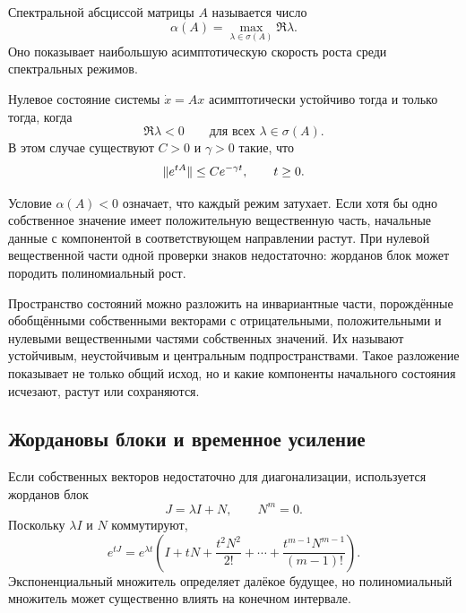 \begin{definition}
Спектральной абсциссой матрицы $A$ называется число
\begin{equation}
\label{eq:spectral-abscissa-v02}
\alpha(A)=\max_{\lambda\in\sigma(A)}\Re\lambda.
\end{equation}
Оно показывает наибольшую асимптотическую скорость роста среди спектральных режимов.
\end{definition}

\begin{theorem}
\label{thm:linear-spectral-stability-v02}
Нулевое состояние системы $\dot x=Ax$ асимптотически устойчиво тогда и только тогда, когда
\[
\Re\lambda<0
\qquad
\text{для всех }\lambda\in\sigma(A).
\]
В этом случае существуют $C>0$ и $\gamma>0$ такие, что
\begin{equation}
\label{eq:linear-exponential-decay-v02}
\lVert e^{tA}\rVert\leq Ce^{-\gamma t},
\qquad t\geq0.
\end{equation}
\end{theorem}

Условие $\alpha(A)<0$ означает, что каждый режим затухает. Если хотя бы одно собственное значение имеет положительную вещественную часть, начальные данные с компонентой в соответствующем направлении растут. При нулевой вещественной части одной проверки знаков недостаточно: жорданов блок может породить полиномиальный рост.

Пространство состояний можно разложить на инвариантные части, порождённые обобщёнными собственными векторами с отрицательными, положительными и нулевыми вещественными частями собственных значений. Их называют устойчивым, неустойчивым и центральным подпространствами. Такое разложение показывает не только общий исход, но и какие компоненты начального состояния исчезают, растут или сохраняются.

\subsection{Жордановы блоки и временное усиление}

Если собственных векторов недостаточно для диагонализации, используется жорданов блок
\[
J=\lambda I+N,
\qquad
N^m=0.
\]
Поскольку $\lambda I$ и $N$ коммутируют,
\begin{equation}
\label{eq:jordan-exponential-v02}
e^{tJ}
=
e^{\lambda t}
\left(
I+tN+\frac{t^2N^2}{2!}+\cdots+
\frac{t^{m-1}N^{m-1}}{(m-1)!}
\right).
\end{equation}
Экспоненциальный множитель определяет далёкое будущее, но полиномиальный множитель может существенно влиять на конечном интервале.

